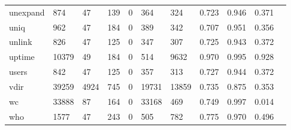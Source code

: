 \begin{longtable}{lp{1.10cm}p{1.10cm}p{1.10cm}p{1.10cm}p{1.10cm}p{1.10cm}p{1.10cm}p{1.10cm}p{1.10cm}p{1.10cm}}
unexpand  &                    874 &                                 47 &                               139 &                                0 &                               364 &                             324 &                             0.723 &                                 0.946 &                               0.371 \\
uniq      &                    962 &                                 47 &                               184 &                                0 &                               389 &                             342 &                             0.707 &                                 0.951 &                               0.356 \\
unlink    &                    826 &                                 47 &                               125 &                                0 &                               347 &                             307 &                             0.725 &                                 0.943 &                               0.372 \\
uptime    &                  10379 &                                 49 &                               184 &                                0 &                               514 &                            9632 &                             0.970 &                                 0.995 &                               0.928 \\
users     &                    842 &                                 47 &                               125 &                                0 &                               357 &                             313 &                             0.727 &                                 0.944 &                               0.372 \\
vdir      &                  39259 &                               4924 &                               745 &                                0 &                             19731 &                           13859 &                             0.735 &                                 0.875 &                               0.353 \\
wc        &                  33888 &                                 87 &                               164 &                                0 &                             33168 &                             469 &                             0.749 &                                 0.997 &                               0.014 \\
who       &                   1577 &                                 47 &                               243 &                                0 &                               505 &                             782 &                             0.775 &                                 0.970 &                               0.496 \\

\end{longtable}
